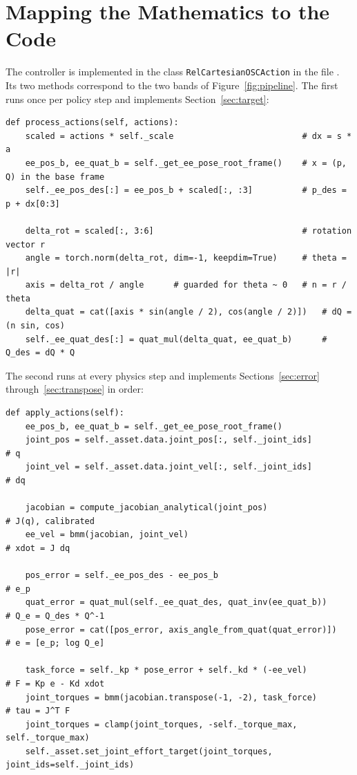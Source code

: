 \documentclass{article}
\newcommand{\code}[1]{\texttt{#1}}
\begin{document}
\section{Mapping the Mathematics to the Code}
\label{sec:code}

The controller is implemented in the class \code{RelCartesianOSCAction} in the file . Its two methods correspond to the two bands of Figure~\ref{fig:pipeline}. The first runs once per policy step and implements Section~\ref{sec:target}:

\begin{lstlisting}
def process_actions(self, actions):
    scaled = actions * self._scale                          # dx = s * a
    ee_pos_b, ee_quat_b = self._get_ee_pose_root_frame()    # x = (p, Q) in the base frame
    self._ee_pos_des[:] = ee_pos_b + scaled[:, :3]          # p_des = p + dx[0:3]

    delta_rot = scaled[:, 3:6]                              # rotation vector r
    angle = torch.norm(delta_rot, dim=-1, keepdim=True)     # theta = |r|
    axis = delta_rot / angle      # guarded for theta ~ 0   # n = r / theta
    delta_quat = cat([axis * sin(angle / 2), cos(angle / 2)])   # dQ = (n sin, cos)
    self._ee_quat_des[:] = quat_mul(delta_quat, ee_quat_b)      # Q_des = dQ * Q
\end{lstlisting}

The second runs at every physics step and implements Sections~\ref{sec:error} through~\ref{sec:transpose} in order:

\begin{lstlisting}
def apply_actions(self):
    ee_pos_b, ee_quat_b = self._get_ee_pose_root_frame()
    joint_pos = self._asset.data.joint_pos[:, self._joint_ids]        # q
    joint_vel = self._asset.data.joint_vel[:, self._joint_ids]        # dq

    jacobian = compute_jacobian_analytical(joint_pos)                 # J(q), calibrated
    ee_vel = bmm(jacobian, joint_vel)                                 # xdot = J dq

    pos_error = self._ee_pos_des - ee_pos_b                           # e_p
    quat_error = quat_mul(self._ee_quat_des, quat_inv(ee_quat_b))     # Q_e = Q_des * Q^-1
    pose_error = cat([pos_error, axis_angle_from_quat(quat_error)])   # e = [e_p; log Q_e]

    task_force = self._kp * pose_error + self._kd * (-ee_vel)         # F = Kp e - Kd xdot
    joint_torques = bmm(jacobian.transpose(-1, -2), task_force)       # tau = J^T F
    joint_torques = clamp(joint_torques, -self._torque_max, self._torque_max)
    self._asset.set_joint_effort_target(joint_torques, joint_ids=self._joint_ids)
\end{lstlisting}
\end{document}
